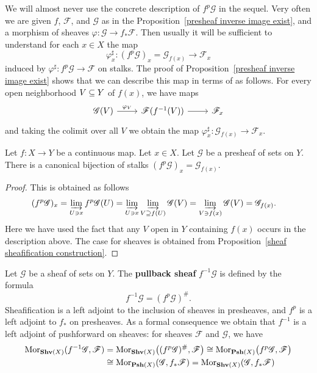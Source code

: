 \begin{remark}
We will almost never use the concrete description of $f^{p}\mathscr{G}$ in the sequel. Very often we are given $f$, $\mathscr{F}$, and $\mathscr{G}$ as in the Proposition~\ref{presheaf inverse image exist}, and a morphism of sheaves $\varphi:\mathscr{G}\to f_*\mathscr{F}$. Then usually it will be sufficient to understand for each $x\in X$ the map
\[\varphi^{\sharp}_x:(f^{p}\mathscr{G})_x=\mathscr{G}_{f(x)}\to\mathscr{F}_x\]
induced by $\varphi^{\sharp}:f^{p}\mathscr{G}\to\mathscr{F}$ on stalks. The proof of Proposition~\ref{presheaf inverse image exist} shows that we can describe this map in terms of as follows. For every open neighborhood $V\subseteq Y$ of $f(x)$, we have maps
\[\begin{tikzcd}
\mathscr{G}(V)\ar[r,"\varphi_V"]&\mathscr{F}(f^{-1}(V))\ar[r]&\mathscr{F}_x
\end{tikzcd}\]
and taking the colimit over all $V$ we obtain the map $\varphi^{\sharp}_x:\mathscr{G}_{f(x)}\to\mathscr{F}_x$.
\end{remark}
\begin{proposition}\label{pull back stalk}
Let $f:X\to Y$ be a continuous map. Let $x\in X$. Let $\mathscr{G}$ be a presheaf of sets on $Y$. There is a canonical bijection of stalks $(f^{p}\mathscr{G})_x=\mathscr{G}_{f(x)}$.
\end{proposition}
\begin{proof}
This is obtained as follows
\begin{align*}
(f^{p}\mathscr{G})_x&=\varinjlim\limits_{U\ni x}f^{p}\mathscr{G}(U)=\varinjlim\limits_{U\ni x}\varinjlim\limits_{V\supseteq f(U)}\mathscr{G}(V)=\varinjlim\limits_{V\ni f(x)}\mathscr{G}(V)=\mathscr{G}_{f(x)}.
\end{align*}
Here we have used the fact that any $V$ open in $Y$ containing $f(x)$ occurs in the description above. The case for sheaves is obtained from Proposition~\ref{sheaf sheafification construction}.
\end{proof}
Let $\mathscr{G}$ be a sheaf of sets on $Y$. The \textbf{pullback sheaf} $f^{-1}\mathscr{G}$ is defined by the formula
\[f^{-1}\mathscr{G}=(f^{p}\mathscr{G})^{\#}.\]
Sheafification is a left adjoint to the inclusion of sheaves in presheaves, and $f^{p}$ is a left adjoint to $f_*$ on presheaves. As a formal consequence we obtain that $f^{-1}$ is a left adjoint of pushforward on sheaves: for sheaves $\mathscr{F}$ and $\mathscr{G}$, we have
\begin{align*}
\mathrm{Mor}_{\mathbf{Shv}(X)}(f^{-1}\mathscr{G},\mathscr{F})&=\mathrm{Mor}_{\mathbf{Shv}(X)}\big((f^{p}\mathscr{G})^{\#},\mathscr{F}\big)\cong\mathrm{Mor}_{\mathbf{Psh}(X)}\big(f^{p}\mathscr{G},\mathscr{F}\big)\\
&\cong\mathrm{Mor}_{\mathbf{Psh}(X)}(\mathscr{G},f_*\mathscr{F})=\mathrm{Mor}_{\mathbf{Shv}(X)}(\mathscr{G},f_*\mathscr{F})
\end{align*}
